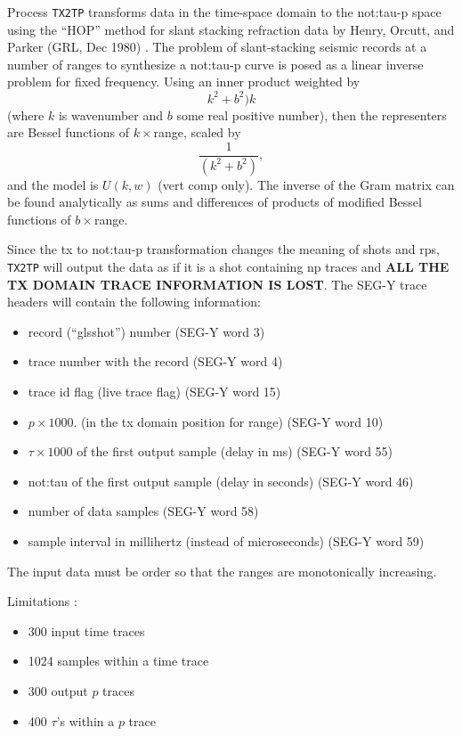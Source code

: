 Process \texttt{TX2TP} transforms data in the time-space domain to the \gls{not:tau}-p
space using the ``HOP'' method for slant stacking refraction data by
Henry, Orcutt, and Parker (GRL, Dec 1980) \cite{tau_p_1980}. The problem of slant-stacking
seismic records at a number of ranges to synthesize a \gls{not:tau}-p curve is
posed as a linear inverse problem for fixed frequency.  Using an inner
product weighted by
\begin{equation}
    k^{2} + b^{2}) k
\end{equation}
 (where $k$ is wavenumber and $b$ some real positive number), then the
 representers are Bessel functions of $k \times$range, scaled by
\begin{equation}
\dfrac{1}{(k^{2} + b^{2})},
\end{equation}
and the model is $U(k,w)$ (vert comp only).  The
inverse of the Gram matrix can be found analytically as sums and
differences of products of modified Bessel functions of $b \times$range.

Since the tx to \gls{not:tau}-p transformation changes the meaning of \glspl{shot} and
\glspl{rp}, \texttt{TX2TP} will output the data as if it is a \gls{shot} containing np traces
and \textbf{ALL THE TX DOMAIN TRACE INFORMATION IS LOST}.  The SEG-Y trace
headers will contain the following information:

\begin{itemize}
\item record (``gls{shot}'') number   (SEG-Y word 3)
\item trace number with the record  (SEG-Y word 4)
\item trace id flag (live trace flag)  (SEG-Y word 15)
\item $p \times 1000$. (in the tx domain position for range)  (SEG-Y word 10)
\item $\tau \times 1000$ of the first output sample (delay in ms) (SEG-Y word 55)
\item \gls{not:tau} of the first output sample (delay in seconds) (SEG-Y word 46)
\item number of data samples (SEG-Y word 58)
\item sample interval in millihertz (instead of microseconds) (SEG-Y word 59)
\end{itemize}

The input data must be order so that the ranges are monotonically
increasing.

Limitations :
\begin{itemize}
\item 300 input time traces
\item 1024 samples within a time trace
\item 300 output $p$ traces
\item 400 $\tau$'s within a $p$ trace
\end{itemize}


